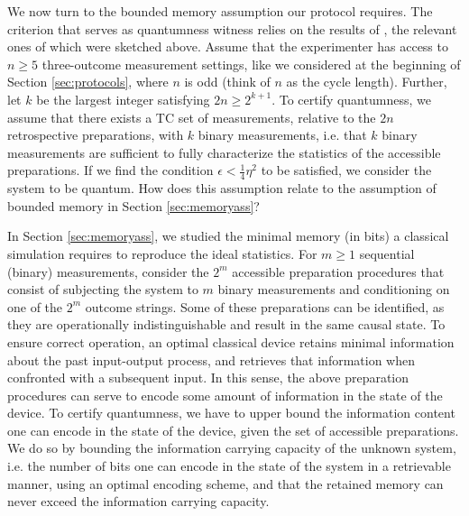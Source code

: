 We now turn to the bounded memory assumption our protocol requires. The criterion that serves as quantumness witness relies on the results of \cite{Pusey2019a}, the relevant ones of which were sketched above. Assume that the experimenter has access to $n\geq 5$ three-outcome measurement settings, like we considered at the beginning of Section \ref{sec:protocols}, where $n$ is odd (think of $n$ as the cycle length). Further, let $k$ be the largest integer satisfying $2n\geq 2^{k+1}$. To certify quantumness, we assume that there exists a TC set of measurements, relative to the $2n$ retrospective preparations, with $k$ binary measurements, i.e. that $k$ binary measurements are sufficient to fully characterize the statistics of the accessible preparations. If we find the condition $\epsilon<\frac{1}{4}\eta^2$ to be satisfied, we consider the system to be quantum.  How does this assumption relate to the assumption of bounded memory in Section \ref{sec:memoryass}? 

In Section \ref{sec:memoryass}, we studied the minimal memory (in bits) a classical simulation requires to reproduce the ideal statistics. 
For $m\geq1$ sequential (binary) measurements, consider the $2^m$ accessible preparation procedures that consist of subjecting the system to $m$ binary measurements and conditioning on one of the $2^m$ outcome strings. Some of these preparations can be identified, as they are operationally indistinguishable and result in the same causal state. To ensure correct operation, an optimal classical device retains minimal information about the past input-output process, and retrieves that information when confronted with a subsequent input. In this sense, the above preparation procedures can serve to encode some amount of information in the state of the device. To certify quantumness, we have to upper bound the information content one can encode in the state of the device, given the set of accessible preparations. We do so by bounding the information carrying capacity of the unknown system, i.e. the number of bits one can encode in the state of the system in a retrievable manner, using an optimal encoding scheme, and that the retained memory can never exceed the information carrying capacity. 

